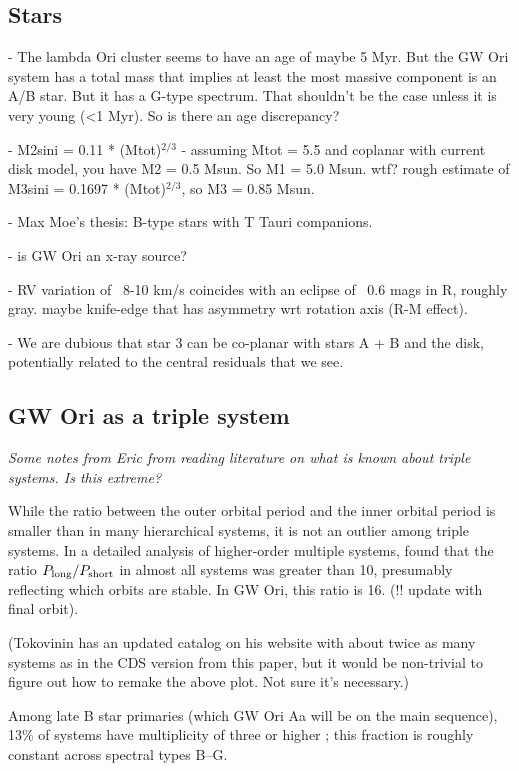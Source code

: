\documentclass{aastex6}
\begin{document}
\subsection{Stars}

- The lambda Ori cluster seems to have an age of maybe 5 Myr.  But the GW Ori system has a total mass that implies at least the most massive component is an A/B star.  But it has a G-type spectrum.  That shouldn't be the case unless it is very young (<1 Myr).  So is there an age discrepancy?

- M2sini = 0.11 * (Mtot)$^{2/3}$
- assuming Mtot = 5.5 and coplanar with current disk model, you have M2 = 0.5 Msun.  So M1 = 5.0 Msun.  wtf?  rough estimate of M3sini = 0.1697 * (Mtot)$^{2/3}$, so M3 = 0.85 Msun.

- Max Moe's thesis: B-type stars with T Tauri companions. 

- is GW Ori an x-ray source?

- RV variation of ~8-10 km/s coincides with an eclipse of ~0.6 mags in R, roughly gray.  maybe knife-edge that has asymmetry wrt rotation axis (R-M effect).  

- We are dubious that star 3 can be co-planar with stars A + B and the disk, potentially related to the central residuals that we see.


\subsection{GW Ori as a triple system}

{\it Some notes from Eric from reading literature on what is known about triple systems.  Is this extreme?}

While the ratio between the outer orbital period and the inner orbital period is smaller than in many hierarchical systems, it is not an outlier among triple systems.  In a detailed analysis of higher-order multiple systems, \citet{tokovinin97} found that the ratio $P_{\rm long} / P_{\rm short}$ in almost all systems was greater than 10, presumably reflecting which orbits are stable.  In GW Ori, this ratio is 16.  (!! update with final orbit).  

(Tokovinin has an updated catalog on his website with about twice as many systems as in the CDS version from this paper, but it would be non-trivial to figure out how to remake the above plot.  Not sure it's necessary.)

Among late B star primaries (which GW Ori Aa will be on the main sequence), 13\% of systems have multiplicity of three or higher \citep{eggleton08}; this fraction is roughly constant across spectral types B--G. 
\end{document}
